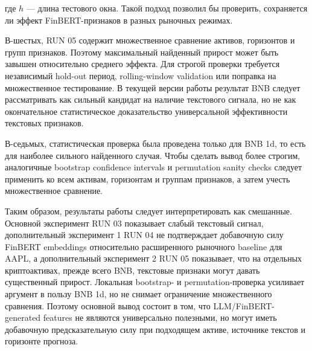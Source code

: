 где $h$ --- длина тестового окна. Такой подход позволил бы проверить, сохраняется ли эффект FinBERT-признаков в разных рыночных режимах.

В-шестых, RUN 05 содержит множественное сравнение активов, горизонтов и групп признаков. Поэтому максимальный найденный прирост может быть завышен относительно среднего эффекта. Для строгой проверки требуется независимый hold-out период, rolling-window validation или поправка на множественное тестирование. В текущей версии работы результат BNB следует рассматривать как сильный кандидат на наличие текстового сигнала, но не как окончательное статистическое доказательство универсальной эффективности текстовых признаков.

В-седьмых, статистическая проверка была проведена только для BNB 1d, то есть для наиболее сильного найденного случая. Чтобы сделать вывод более строгим, аналогичные bootstrap confidence intervals и permutation sanity checks следует применить ко всем активам, горизонтам и группам признаков, а затем учесть множественное сравнение.

Таким образом, результаты работы следует интерпретировать как смешанные. Основной эксперимент RUN 03 показывает слабый текстовый сигнал, дополнительный эксперимент 1 RUN 04 не подтверждает добавочную силу FinBERT embeddings относительно расширенного рыночного baseline для AAPL, а дополнительный эксперимент 2 RUN 05 показывает, что на отдельных криптоактивах, прежде всего BNB, текстовые признаки могут давать существенный прирост. Локальная bootstrap- и permutation-проверка усиливает аргумент в пользу BNB 1d, но не снимает ограничение множественного сравнения. Поэтому основной вывод состоит в том, что LLM/FinBERT-generated features не являются универсально полезными, но могут иметь добавочную предсказательную силу при подходящем активе, источнике текстов и горизонте прогноза.
